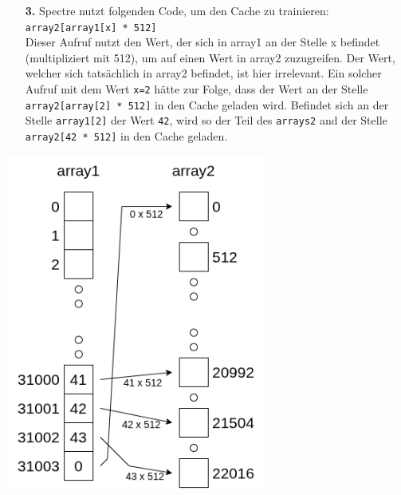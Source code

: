 \noindent
\begin{minipage}{0.58\textwidth}
	\begin{itemize}
		\item[\textbf{3.}] Spectre nutzt folgenden Code, um den Cache zu trainieren: \\
		      \label{itm:spectre_step3_code}
		      \texttt{array2[array1[x] * 512]} \\
		      Dieser Aufruf nutzt den Wert, der sich in array1 an der Stelle x befindet (multipliziert mit 512), um auf einen Wert in array2 zuzugreifen.
		      Der Wert, welcher sich tatsächlich in array2 befindet, ist hier irrelevant.
		      Ein solcher Aufruf mit dem Wert \texttt{x=2} hätte zur Folge, dass der Wert an der Stelle \texttt{array2[array[2] * 512]} in den Cache geladen wird.
		      Befindet sich an der Stelle \texttt{array1[2]} der Wert \texttt{42}, wird so der Teil des \texttt{arrays2} and der Stelle \texttt{array2[42 * 512]} in den Cache geladen.
	\end{itemize}
\end{minipage}
\hfill
\begin{minipage}{0.4\textwidth}
	\centering
	\includegraphics[width=\linewidth]{Attack-2}
\end{minipage}

